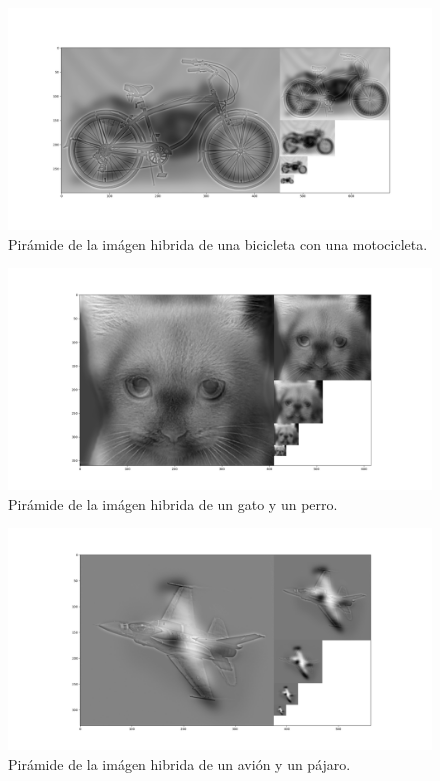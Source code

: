 \documentclass[12pt, spanish]{article}
\begin{document}
\begin{figure}[H]
  \centering
      \includegraphics[width=\textwidth]{hibridas/PB-M.png}
 		 \caption{Pirámide de la imágen hibrida de una bicicleta con una motocicleta.}
  		\label{fig:ej2al}

\end{figure}


\begin{figure}[H]
  \centering
      \includegraphics[width=\textwidth]{hibridas/PG-P.png}
 		 \caption{Pirámide de la imágen hibrida de un gato y un perro.}
  		\label{fig:ej2al}

\end{figure}


\begin{figure}[H]
  \centering
      \includegraphics[width=\textwidth]{hibridas/PA-P.png}
 		 \caption{Pirámide de la imágen hibrida de un avión y un pájaro.}
  		\label{fig:ej2al}

\end{figure}
\end{document}
